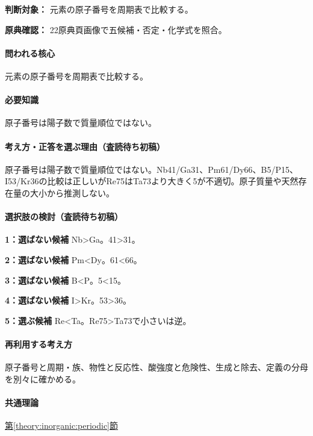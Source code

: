 \noindent\textbf{判断対象：} 元素の原子番号を周期表で比較する。\par

\noindent\textbf{原典確認：} 22原典頁画像で五候補・否定・化学式を照合。\par

\paragraph{問われる核心} 元素の原子番号を周期表で比較する。

\paragraph{必要知識} 原子番号は陽子数で質量順位ではない。

\paragraph{考え方・正答を選ぶ理由（査読待ち初稿）} 原子番号は陽子数で質量順位ではない。Nb41/Ga31、Pm61/Dy66、B5/P15、I53/Kr36の比較は正しいがRe75はTa73より大きく5が不適切。原子質量や天然存在量の大小から推測しない。

\paragraph{選択肢の検討（査読待ち初稿）}\mbox{}\par

\noindent\textbf{1：選ばない候補} Nb>Ga。41>31。\par

\noindent\textbf{2：選ばない候補} Pm<Dy。61<66。\par

\noindent\textbf{3：選ばない候補} B<P。5<15。\par

\noindent\textbf{4：選ばない候補} I>Kr。53>36。\par

\noindent\textbf{5：選ぶ候補} Re<Ta。Re75>Ta73で小さいは逆。\par

\paragraph{再利用する考え方} 原子番号と周期・族、物性と反応性、酸強度と危険性、生成と除去、定義の分母を別々に確かめる。

\paragraph{共通理論} \hyperref[theory:inorganic:periodic]{第\ref*{theory:inorganic:periodic}節}


